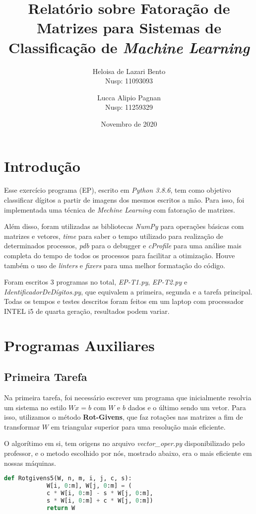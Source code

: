 \documentclass[a4paper, 12pt]{article}
\title{Relatório sobre Fatoração de Matrizes para Sistemas de Classificação de \textit{Machine Learning}}
\author{Heloisa de Lazari Bento \\ Nusp: 11093093 \and Lucca Alipio Pagnan \\ Nusp: 11259329}
\date{Novembro de 2020}
\begin{document}
\maketitle

\section{Introdução}

    Esse exercício programa (EP), escrito em \textit{Python 3.8.6}, tem como objetivo classificar dígitos a partir de imagens dos mesmos escritos a mão.
    Para isso, foi implementada uma técnica de \textit{Mechine Learning} com fatoração de matrizes.

    Além disso, foram utilizadas as bibliotecas \textit{NumPy} para operações básicas com matrizes e vetores, \textit{time} para saber o tempo utilizado para realização de determinados processos, \textit{pdb} para o debugger e \textit{cProfile} para uma análise mais completa do tempo de todos os processos para facilitar a otimização.
    Houve também o uso de \textit{linters} e \textit{fixers} para uma melhor formatação do código.

    Foram escritos 3 programas no total, \textit{EP-T1.py}, \textit{EP-T2.py} e \textit{IdentificadorDeDígitos.py}, que equivalem a primeira, segunda e a tarefa principal.
    Todas os tempos e testes descritos foram feitos em um laptop com processador INTEL i5 de quarta geração, resultados podem variar.

\section{Programas Auxiliares}

\subsection{Primeira Tarefa}

    Na primeira tarefa, foi necessário escrever um programa que inicialmente resolvia um sistema no estilo  $Wx = b$ com  $W$ e $b$ dados e o último sendo um vetor.
    Para isso, utilizamos o método \textbf{Rot-Givens}, que faz rotações nas matrizes a fim de transformar $W$ em triangular superior para uma resolução mais eficiente.

    O algorítimo em si, tem origens no arquivo \textit{vector\_oper.py} disponibilizado pelo professor, e o metodo escolhido por nós, mostrado abaixo, era o mais eficiente em nossas máquinas.
    \begin{lstlisting}[language=Python]
        def Rotgivens5(W, n, m, i, j, c, s):
            W[i, 0:m], W[j, 0:m] = (
            c * W[i, 0:m] - s * W[j, 0:m],
            s * W[i, 0:m] + c * W[j, 0:m])
            return W
    \end{lstlisting}
\end{document}

